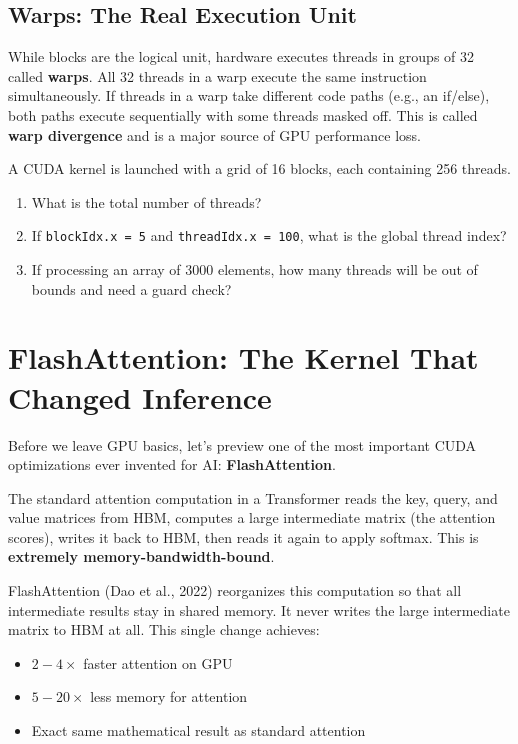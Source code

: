 \documentclass[11pt, twoside, openright]{book}
\newcounter{exercise}[chapter]
\newenvironment{exercise}[1][]
  {\refstepcounter{exercise}
   \begin{tcolorbox}[enhanced, breakable,
    colback={rgb,255:red,248;green,248;blue,248},
    colframe=DarkGray, boxrule=0.8pt, arc=3pt,
    title={\bfseries Exercise \thechapter.\theexercise\ifx&#1&\else: #1\fi},
    fonttitle=\bfseries\small,
    attach boxed title to top left={yshift=-2mm, xshift=5mm},
    boxed title style={colback=DarkGray, coltext=white, arc=2pt}]}
  {\end{tcolorbox}}
\newcommand{\keyterm}[1]{\textbf{\color{AccentOrange}#1}}
\begin{document}
\subsection{Warps: The Real Execution Unit}

While blocks are the logical unit, hardware executes threads in groups of 32
called \keyterm{warps}.  All 32 threads in a warp execute the same
instruction simultaneously.  If threads in a warp take different code paths
(e.g., an if/else), both paths execute sequentially with some threads masked off.
This is called \keyterm{warp divergence} and is a major
source of GPU performance loss.

\begin{exercise}[Thread Index Calculation]
A CUDA kernel is launched with a grid of 16 blocks, each containing 256 threads.
\begin{enumerate}
  \item What is the total number of threads?
  \item If \texttt{blockIdx.x = 5} and \texttt{threadIdx.x = 100},
        what is the global thread index?
  \item If processing an array of 3000 elements, how many threads will be out
        of bounds and need a guard check?
\end{enumerate}
\end{exercise}

\section{FlashAttention: The Kernel That Changed Inference}

Before we leave GPU basics, let's preview one of the most important CUDA
optimizations ever invented for AI: \keyterm{FlashAttention}.

The standard attention computation in a Transformer reads the key, query, and
value matrices from HBM, computes a large intermediate matrix (the attention
scores), writes it back to HBM, then reads it again to apply softmax.  This is
\textbf{extremely memory-bandwidth-bound}.

FlashAttention (Dao et al., 2022) reorganizes this computation so that all
intermediate results stay in shared memory.  It never writes the large intermediate
matrix to HBM at all.  This single change achieves:

\begin{itemize}
  \item $2-4\times$ faster attention on GPU
  \item $5-20\times$ less memory for attention
  \item Exact same mathematical result as standard attention
\end{itemize}
\end{document}
